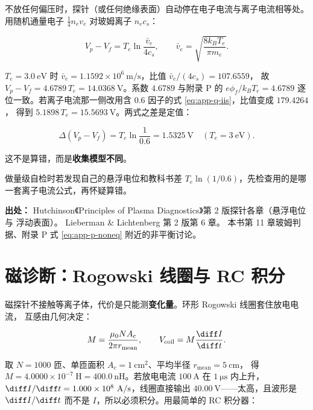 不放任何偏压时，探针（或任何绝缘表面）自动停在电子电流与离子电流相等处。用随机通量电子
$\frac14 n_ev_e$ 对玻姆离子 $n_ec_s$：

\begin{equation}
  V_p - V_f = T_e\ln\frac{\bar v_e}{4c_s},
  \qquad
  \bar v_e = \sqrt{\frac{8k_BT_e}{\pi m_e}}.
  \label{eq:app-q-float}
\end{equation}

$T_e=3.0\ \mathrm{eV}$ 时 $\bar v_e=1.1592\times10^{6}\ \mathrm{m/s}$，比值 $\bar v_e/(4c_s)=107.6559$，
故 $V_p-V_f=4.6789\,T_e=14.0368\ \mathrm{V}$。系数 $4.6789$ 与附录 P 的 $e\phi_f/k_BT_e=4.6789$
逐位一致。若离子电流那一侧改用含 $0.6$ 因子的式 \eqref{eq:app-q-iis}，比值变成 $179.4264$，
得到 $5.1898\,T_e=15.5693\ \mathrm{V}$。两式之差是定值：

\begin{equation}
  \Delta(V_p-V_f) = T_e\ln\frac{1}{0.6} = 1.5325\ \mathrm{V}\quad(T_e=3\ \mathrm{eV}).
  \label{eq:app-q-floatdiff}
\end{equation}

这不是算错，而是\textbf{收集模型不同}。

做量级自检时若发现自己的悬浮电位和教科书差 $T_e\ln(1/0.6)$，先检查用的是哪一套离子电流公式，再怀疑算错。

{\footnotesize
\textbf{出处：} Hutchinson《Principles of Plasma Diagnostics》第 2 版探针各章（悬浮电位与
浮动表面）。
Lieberman \& Lichtenberg 第 2 版第 6 章。
本书第 11 章玻姆判据、附录 P 式
\eqref{eq:app-p-noneq} 附近的非平衡讨论。
}

\section{磁诊断：Rogowski 线圈与 RC 积分}
\label{sec:app-q-magnetic}

磁探针不接触等离子体，代价是只能测\textbf{变化量}。环形 Rogowski 线圈套住放电电流，
互感由几何决定：

\begin{equation}
  M = \frac{\mu_0 N A_c}{2\pi r_{\mathrm{mean}}},
  \qquad
  V_{\mathrm{coil}} = M\frac{\diff I}{\diff t}.
  \label{eq:app-q-mutual}
\end{equation}

取 $N=1000$ 匝、单匝面积 $A_c=1\ \mathrm{cm^2}$、平均半径 $r_{\mathrm{mean}}=5\ \mathrm{cm}$，
得 $M=4.0000\times10^{-7}\ \mathrm{H}=400.0\ \mathrm{nH}$。若放电电流 $100\ \mathrm{A}$ 在
$1\ \mathrm{\mu s}$ 内上升，$\diff I/\diff t=1.000\times10^{8}\ \mathrm{A/s}$，线圈直接输出
$40.00\ \mathrm{V}$——太高，且波形是 $\diff I/\diff t$ 而不是 $I$，所以必须积分。用最简单的
RC 积分器：

